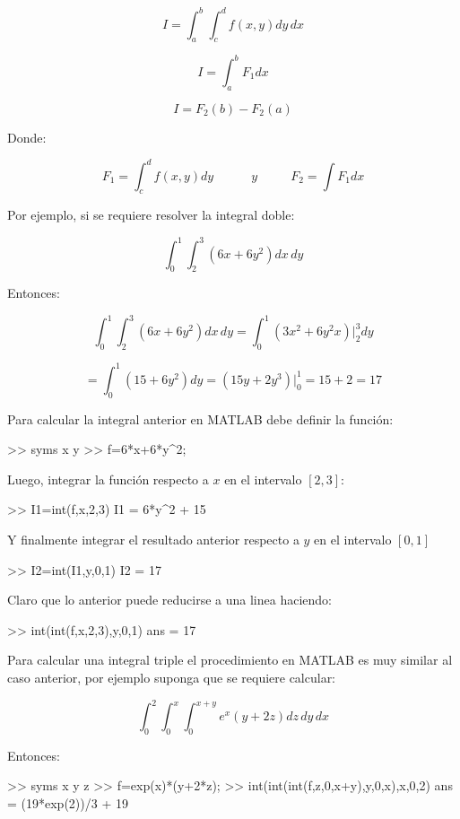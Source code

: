 $$ I=\int_a^b \int_c^d f(x,y) dy \, dx $$

$$ I=\int_a^b  F_1  dx $$

$$ I=F_2(b) - F_2(a) $$

Donde:

$$ F_1 = \int_c^d f(x,y) dy
\,\,\,\,\,\,\,\,\,\,\,\,\,\,\,\,\,\, y \,\,\,\,\,\,\,\,\,\,\,\,\,\,\,\,
F_2 = \int F_1 dx $$

Por ejemplo, si se requiere resolver la integral doble:

$$ \int_0^1 \int_2^3 \left( 6x+6y^2 \right) dx \, dy$$

Entonces:

$$ \int_0^1 \int_2^3 \left( 6x+6y^2 \right) dx \, dy = \int_0^1 \left(3x^2+6y^2x\right)\bigg|_2^3 dy $$

$$  = \int_0^1 \left(15+6y^2\right) dy = \left( 15y + 2y^3\right) \bigg|_0^1 = 15 + 2 = 17 $$

Para calcular la integral anterior en MATLAB debe definir la función:

\begin{matlab}
>> syms x y
>> f=6*x+6*y^2;
\end{matlab}

Luego, integrar la función respecto a $x$ en el intervalo $[2,3]$:

\begin{matlab}
>> I1=int(f,x,2,3)
I1 =
6*y^2 + 15
\end{matlab}

Y finalmente integrar el resultado anterior respecto a $y$ en
el intervalo $[0,1]$

\begin{matlab}
>> I2=int(I1,y,0,1)
I2 =
17
\end{matlab}

Claro que lo anterior puede reducirse a una linea haciendo:

\begin{matlab}
>> int(int(f,x,2,3),y,0,1)
ans =
17
\end{matlab}

Para calcular una integral triple el procedimiento en MATLAB es muy
similar al caso anterior, por ejemplo suponga que se requiere calcular:

$$ \int_0^2 \int_0^x \int_0^{x+y} e^{x}\left(y+2z\right) dz \, dy \, dx $$

Entonces:

\begin{matlab}
>> syms x y z
>> f=exp(x)*(y+2*z);
>> int(int(int(f,z,0,x+y),y,0,x),x,0,2)
ans =
(19*exp(2))/3 + 19
\end{matlab}

